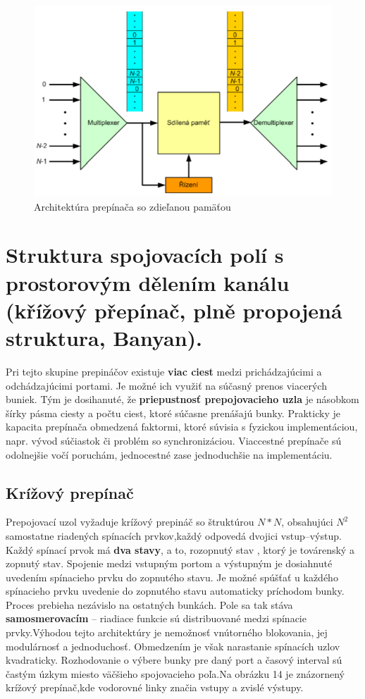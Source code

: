 \begin{figure}[ht]
\centering
  \begin{center}
    \includegraphics[scale=0.8]{BPC-HWS/images/zdiel_pamat.png}
  \end{center}
  \caption[Architektúra prepínača so zdieľanou pamäťou]{Architektúra prepínača so zdieľanou pamäťou}
\end{figure}

\newpage
\section{Struktura spojovacích polí s prostorovým dělením kanálu (křížový přepínač, plně propojená struktura, Banyan).}
Pri tejto skupine prepináčov existuje \textbf{viac ciest} medzi prichádzajúcimi a odchádzajúcimi portami. Je možné ich využiť na súčasný prenos viacerých buniek. Tým je dosihanuté, že \textbf{priepustnosť prepojovacieho uzla} je násobkom šírky pásma ciesty a počtu ciest, ktoré súčasne prenášajú bunky. Prakticky je kapacita prepínača obmedzená faktormi, ktoré súvisia s fyzickou implementáciou, napr. vývod súčiastok či problém so synchronizáciou. Viaccestné prepínače sú odolnejšie vočí poruchám, jednocestné zase jednoduchšie na implementáciu.

\subsection {Krížový prepínač}
Prepojovací uzol vyžaduje krížový prepináč so štruktúrou $N*N$, obsahujúci $N^2$ samostatne riadených spínacích prvkov,každý odpovedá dvojici vstup--výstup. Každý spínací prvok má \textbf{dva stavy}, a to, rozopnutý stav , ktorý je továrenský a zopnutý stav.
Spojenie medzi vstupným portom a výstupným je dosiahnuté uvedením spínacieho prvku do zopnutého stavu. Je možné spúšťať u každého spínacieho prvku uvedenie do zopnutého stavu automaticky príchodom bunky. Proces prebieha nezávislo na ostatných bunkách. Pole sa tak stáva \textbf{samosmerovacím} -- riadiace funkcie sú distribuované medzi spínacie prvky.Výhodou tejto architektúry je nemožnosť vnútorného blokovania, jej modulárnosť a jednoduchosť. Obmedzením je však narastanie spínacích uzlov kvadraticky. Rozhodovanie o výbere bunky pre daný port a časový interval sú častým úzkym miesto väčšieho spojovacieho poľa.Na obrázku 14 je znázornený krížový prepínač,kde vodorovné linky značia vstupy a zvislé výstupy.


